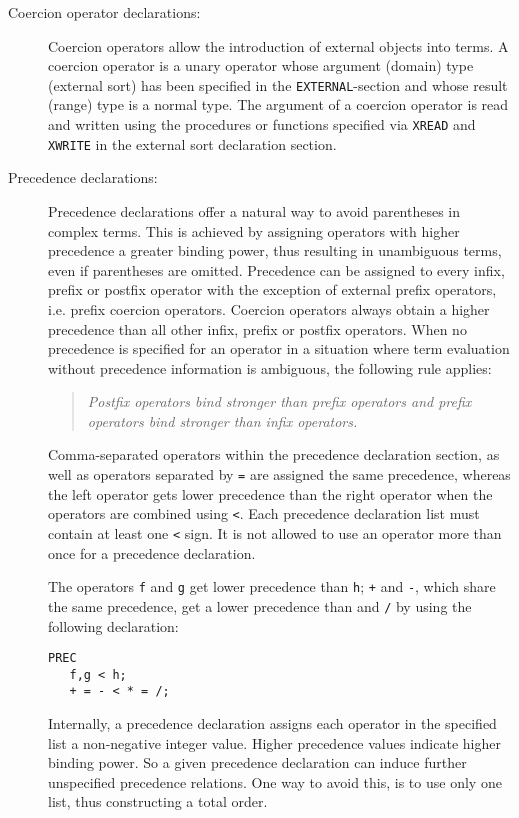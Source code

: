 \begin{description}
\item[Coercion operator declarations:]
Coercion operators allow the introduction of external objects into terms.
A coercion operator is a unary operator whose argument (domain) type (external sort)
has been specified in the {\tt EXTERNAL}-section and whose result (range) type
is a normal type. The argument of a coercion operator is read and
written using the procedures or functions specified via {\tt XREAD}
and {\tt XWRITE} in the external sort declaration section.

\item[Precedence declarations:]
Precedence declarations offer a natural way to avoid parentheses in complex
terms. This is achieved by assigning operators with higher precedence
a greater binding power, thus resulting in unambiguous terms, even
if parentheses are omitted.
Precedence can be assigned to every infix, prefix or postfix operator
with the exception of external prefix operators, i.e. prefix coercion operators.
Coercion operators always obtain a higher precedence than all other
infix, prefix or postfix operators.
When no precedence is specified for an operator in a situation where
term evaluation without precedence information is ambiguous, the following
rule applies:
\begin{quote}
{\em Postfix operators bind stronger than prefix operators and
prefix operators bind stronger than infix operators.}
\label{precrule}
\end{quote}

Comma-separated operators within the precedence declaration section,
as well as operators separated by {\tt =} are assigned the same precedence,
whereas the left operator gets lower precedence than the right operator
when the operators are combined using {\tt <}.
Each precedence declaration list must contain at least one {\tt <}
sign.
It is not allowed to use an operator more than once for a precedence
declaration.

\begin{example}
{\rm
The operators {\tt f} and {\tt g} get lower precedence than {\tt h};
{\tt +} and {\tt -}, which share the same precedence, get a lower
precedence than {\tt *} and {\tt /} by using the following declaration:
\begin{verbatim}
PREC
   f,g < h;
   + = - < * = /;
\end{verbatim}
} %
\end{example}

Internally, a precedence declaration assigns each operator in the specified 
list a non-negative integer value. 
Higher precedence values indicate higher binding power. 
So a given precedence declaration can induce further unspecified precedence
relations. 
One way to avoid this, is to use only one list, thus constructing a total 
order.



\end{description}
